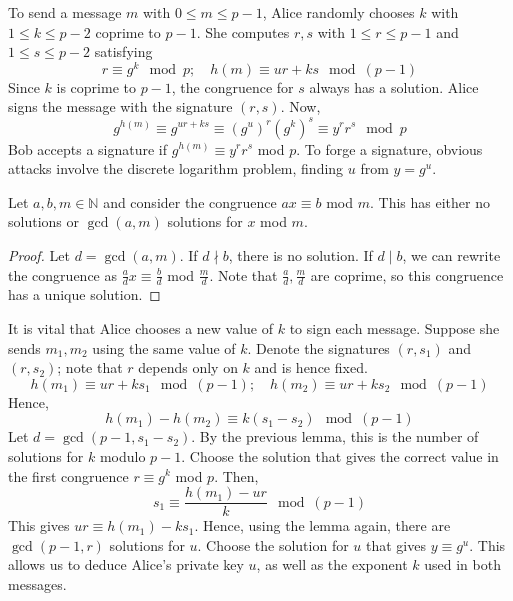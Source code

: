 To send a message \( m \) with \( 0 \leq m \leq p-1 \), Alice randomly chooses \( k \) with \( 1 \leq k \leq p-2 \) coprime to \( p-1 \).
She computes \( r, s \) with \( 1 \leq r \leq p-1 \) and \( 1 \leq s \leq p-2 \) satisfying
\[ r \equiv g^k \mod p;\quad h(m) \equiv ur + ks \mod (p-1) \]
Since \( k \) is coprime to \( p-1 \), the congruence for \( s \) always has a solution.
Alice signs the message with the signature \( (r, s) \).
Now,
\[ g^{h(m)} \equiv g^{ur + ks} \equiv (g^u)^r (g^k)^s \equiv y^r r^s \mod p \]
Bob accepts a signature if \( g^{h(m)} \equiv y^r r^s \) mod \( p \).
To forge a signature, obvious attacks involve the discrete logarithm problem, finding \( u \) from \( y = g^u \).
\begin{lemma}
    Let \( a, b, m \in \mathbb N \) and consider the congruence \( ax \equiv b \) mod \( m \).
    This has either no solutions or \( \gcd(a,m) \) solutions for \( x \) mod \( m \).
\end{lemma}
\begin{proof}
    Let \( d = \gcd(a,m) \).
    If \( d \nmid b \), there is no solution.
    If \( d \mid b \), we can rewrite the congruence as \( \frac{a}{d} x \equiv \frac{b}{d} \) mod \( \frac{m}{d} \).
    Note that \( \frac{a}{d}, \frac{m}{d} \) are coprime, so this congruence has a unique solution.
\end{proof}
It is vital that Alice chooses a new value of \( k \) to sign each message.
Suppose she sends \( m_1, m_2 \) using the same value of \( k \).
Denote the signatures \( (r, s_1) \) and \( (r, s_2) \); note that \( r \) depends only on \( k \) and is hence fixed.
\[ h(m_1) \equiv ur + ks_1 \mod (p-1);\quad h(m_2) \equiv ur + ks_2 \mod (p-1) \]
Hence,
\[ h(m_1) - h(m_2) \equiv k(s_1 - s_2) \mod (p-1) \]
Let \( d = \gcd(p-1, s_1 - s_2) \).
By the previous lemma, this is the number of solutions for \( k \) modulo \( p-1 \).
Choose the solution that gives the correct value in the first congruence \( r \equiv g^k \) mod \( p \).
Then,
\[ s_1 \equiv \frac{h(m_1) - ur}{k} \mod (p-1) \]
This gives \( ur \equiv h(m_1) - ks_1 \).
Hence, using the lemma again, there are \( \gcd(p-1, r) \) solutions for \( u \).
Choose the solution for \( u \) that gives \( y \equiv g^u \).
This allows us to deduce Alice's private key \( u \), as well as the exponent \( k \) used in both messages.

